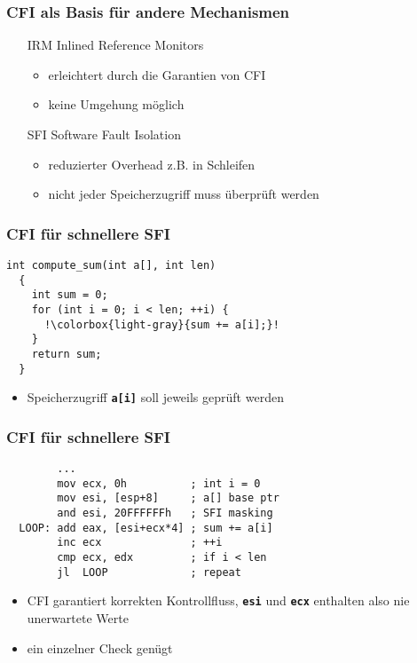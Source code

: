 \documentclass[mathserif,slidestop,compress,red]{beamer}
\begin{document}
\begin{frame}
  \frametitle{CFI als Basis für andere Mechanismen}
  \begin{itemize}
    \item [IRM] Inlined Reference Monitors
    \begin{itemize}
      \item erleichtert durch die Garantien von CFI
      \item keine Umgehung möglich
    \end{itemize}
    \item [SFI] Software Fault Isolation
    \begin{itemize}
      \item reduzierter Overhead z.B. in Schleifen
      \item nicht jeder Speicherzugriff muss überprüft werden
    \end{itemize}
  \end{itemize}
\end{frame}

\lstset{language=C}

\begin{frame}[fragile]
  \frametitle{CFI für schnellere SFI}
  \begin{lstlisting}[escapechar=!]
  int compute_sum(int a[], int len)
  {
    int sum = 0;
    for (int i = 0; i < len; ++i) {
      !\colorbox{light-gray}{sum += a[i];}!
    }
    return sum;
  }
  \end{lstlisting}
  \vspace{1em}
  \begin{itemize}
    \item Speicherzugriff \textbf{\texttt{a[i]}} soll jeweils geprüft werden
  \end{itemize}
\end{frame}

\lstset{language=[x86masm]Assembler}

\begin{frame}[fragile]
  \frametitle{CFI für schnellere SFI}
  \begin{lstlisting}
        ...
        mov ecx, 0h          ; int i = 0
        mov esi, [esp+8]     ; a[] base ptr
        and esi, 20FFFFFFh   ; SFI masking
  LOOP: add eax, [esi+ecx*4] ; sum += a[i]
        inc ecx              ; ++i
        cmp ecx, edx         ; if i < len
        jl  LOOP             ; repeat
  \end{lstlisting}
  \vspace{1em}
  \begin{itemize}
    \item CFI garantiert korrekten Kontrollfluss, \textbf{\texttt{esi}} und \textbf{\texttt{ecx}} enthalten also nie unerwartete Werte
    \item ein einzelner Check genügt
  \end{itemize}
\end{frame}
\end{document}
